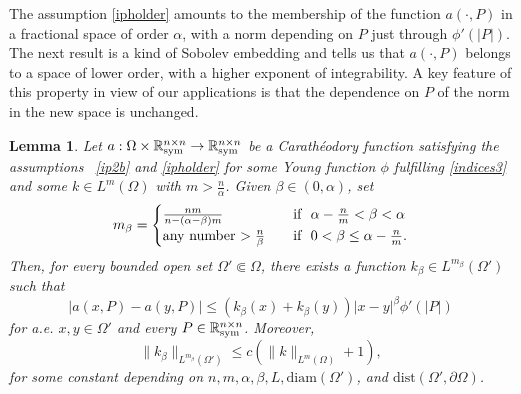 \documentclass[leqno,11pt]{amsart}%
\numberwithin{equation}{section}
\def\real{\mathbb R}
\def\Sym{\real^{n\times n}_{\textup{sym}}}
\newtheorem{lem}[thm]{Lemma}
\theoremstyle{definition}
\numberwithin{equation}{section}
\begin{document}
 
The assumption \eqref{ipholder} amounts to the membership of the function $a(\cdot,P)$ in a fractional  space of order $\alpha$, with a norm depending on $P$ just through $\phi'(|P|)$. The next result is a kind of Sobolev embedding and tells us that  $a(\cdot,P)$ belongs to a  space of lower order, with a higher exponent of integrability. A key feature of this property in view of our applications is that the dependence on $P$ of the 
norm in the new space is unchanged.

\begin{lem}\label{lem:ipholder-beta}
 Let $a:\Omega\times\Sym\to\Sym$ be a Carath\'eodory function satisfying 
the assumptions ~\eqref{ip2b} and \eqref{ipholder}  for some
Young function 
 $\phi$ fulfilling \eqref{indices3} and
some
  $k\in L^{ m}(\Omega)$ with $
  m>\frac{n}{\alpha}$. Given $\beta\in(0,\alpha)$, set
  \begin{align}
      \label{oct5}
      m_\beta = \begin{cases}
          \frac{nm}{n-(\alpha -\beta)m} &\quad \text{if \,\,$ \alpha -\frac nm < \beta < \alpha$}
          \\ \text{any number $>\frac n \beta$} &\quad \text{if\,\, $0< \beta  \leq \alpha -\frac nm$.}
      \end{cases}
  \end{align}
Then, for
  every   bounded open set $\Omega'\Subset\Omega$, there exists a function
  $k_\beta\in L^{ m_\beta}(\Omega')$ 
  such that
  \begin{equation}
    \label{ipholder-beta}
    |a(x,P)-a(y,P)|
    \le
    (k_\beta(x)+k_\beta(y))|x-y|^\beta \phi'(|P|)
\end{equation}
 for a.e. $x,y\in\Omega'$ and every $P\in\Sym$. Moreover,
\begin{equation}\label{est:lem-ipholder-beta}
  \|k_\beta\|_{L^{ m_\beta}(\Omega')}\le c(\|k\|_{L^{
  {m}}(\Omega)}+1),
  \end{equation}
for some  constant depending on $n,
m,\alpha,\beta,L,
\mathrm{diam}(\Omega')
$,  and  $\mathrm{dist}(\Omega',\partial\Omega)$. 
\end{lem}
\end{document}
